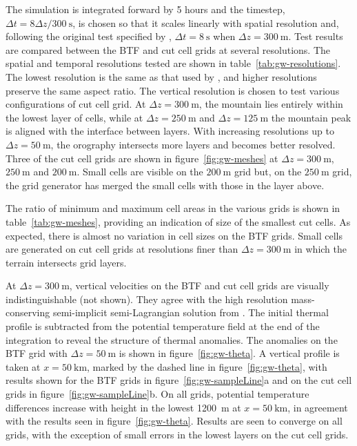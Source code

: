 \documentclass{ametsoc}
\begin{document}
The simulation is integrated forward by 5 hours and the timestep, $\Delta t = 8 \Delta z / \SI{300}{\second}$, is chosen so that it scales linearly with spatial resolution and, following the original test specified by \citet{schaer2002}, $\Delta t = \SI{8}{\second}$ when $\Delta z = \SI{300}{\meter}$.
Test results are compared between the BTF and cut cell grids at several resolutions.
The spatial and temporal resolutions tested are shown in table~\ref{tab:gw-resolutions}.  The lowest resolution is the same as that used by \citet{schaer2002}, and higher resolutions preserve the same aspect ratio.
The vertical resolution is chosen to test various configurations of cut cell grid.  At $\Delta z = \SI{300}{\meter}$, the mountain lies entirely within the lowest layer of cells, while at $\Delta z = \SI{250}{\meter}$ and $\Delta z = \SI{125}{\meter}$ the mountain peak is aligned with the interface between layers.  With increasing resolutions up to $\Delta z = \SI{50}{\meter}$, the orography intersects more layers and becomes better resolved.  Three of the cut cell grids are shown in figure~\ref{fig:gw-meshes} at $\Delta z = \SI{300}{\meter}$, $\SI{250}{\meter}$ and $\SI{200}{\meter}$.  Small cells are visible on the $\SI{200}{\meter}$ grid but, on the $\SI{250}{\meter}$ grid, the grid generator has merged the small cells with those in the layer above.

The ratio of minimum and maximum cell areas in the various grids is shown in table~\ref{tab:gw-meshes}, providing an indication of size of the smallest cut cells.  As expected, there is almost no variation in cell sizes on the BTF grids.  Small cells are generated on cut cell grids at resolutions finer than $\Delta z = \SI{300}{\meter}$ in which the terrain intersects grid layers.

At $\Delta z = \SI{300}{\meter}$, vertical velocities on the BTF and cut cell grids are visually indistinguishable (not shown).  They agree with the high resolution mass-conserving semi-implicit semi-Lagrangian solution from \citet{melvin2010}.
The initial thermal profile is subtracted from the potential temperature field at the end of the integration to reveal the structure of thermal anomalies.  The anomalies on the BTF grid with $\Delta z = \SI{50}{\meter}$ is shown in figure~\ref{fig:gw-theta}.  A vertical profile is taken at $x = \SI{50}{\kilo\meter}$, marked by the dashed line in figure~\ref{fig:gw-theta}, with results shown for the BTF grids in figure~\ref{fig:gw-sampleLine}a and on the cut cell grids in figure~\ref{fig:gw-sampleLine}b.  On all grids, potential temperature differences increase with height in the lowest \SI{1200}{\meter} at $x = \SI{50}{\kilo\meter}$, in agreement with the results seen in figure~\ref{fig:gw-theta}.  Results are seen to converge on all grids, with the exception of small errors in the lowest layers on the cut cell grids.
\end{document}
